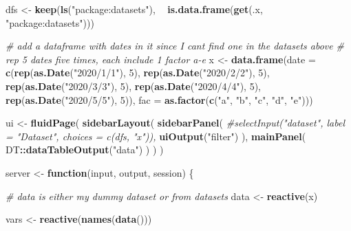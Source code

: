 \documentclass[]{book}
\newenvironment{Shaded}{\begin{snugshade}}{\end{snugshade}}
\newcommand{\CommentTok}[1]{\textcolor[rgb]{0.56,0.35,0.01}{\textit{#1}}}
\newcommand{\ControlFlowTok}[1]{\textcolor[rgb]{0.13,0.29,0.53}{\textbf{#1}}}
\newcommand{\DataTypeTok}[1]{\textcolor[rgb]{0.13,0.29,0.53}{#1}}
\newcommand{\DecValTok}[1]{\textcolor[rgb]{0.00,0.00,0.81}{#1}}
\newcommand{\KeywordTok}[1]{\textcolor[rgb]{0.13,0.29,0.53}{\textbf{#1}}}
\newcommand{\NormalTok}[1]{#1}
\newcommand{\OperatorTok}[1]{\textcolor[rgb]{0.81,0.36,0.00}{\textbf{#1}}}
\newcommand{\StringTok}[1]{\textcolor[rgb]{0.31,0.60,0.02}{#1}}
\begin{document}
\begin{solution}
\begin{Shaded}
\begin{Highlighting}[]
{{\NormalTok{dfs <-}\StringTok{ }\KeywordTok{keep}\NormalTok{(}\KeywordTok{ls}\NormalTok{(}\StringTok{"package:datasets"}\NormalTok{), }\OperatorTok{~}\StringTok{ }\KeywordTok{is.data.frame}\NormalTok{(}\KeywordTok{get}\NormalTok{(.x, }\StringTok{"package:datasets"}\NormalTok{)))}

\CommentTok{# add a dataframe with dates in it since I cant find one in the datasets above}
\CommentTok{# rep 5 dates five times, each include 1 factor a-e}
\NormalTok{x <-}\StringTok{ }\KeywordTok{data.frame}\NormalTok{(}\DataTypeTok{date =} \KeywordTok{c}\NormalTok{(}\KeywordTok{rep}\NormalTok{(}\KeywordTok{as.Date}\NormalTok{(}\StringTok{"2020/1/1"}\NormalTok{), }\DecValTok{5}\NormalTok{),}
                         \KeywordTok{rep}\NormalTok{(}\KeywordTok{as.Date}\NormalTok{(}\StringTok{"2020/2/2"}\NormalTok{), }\DecValTok{5}\NormalTok{),}
                         \KeywordTok{rep}\NormalTok{(}\KeywordTok{as.Date}\NormalTok{(}\StringTok{"2020/3/3"}\NormalTok{), }\DecValTok{5}\NormalTok{),}
                         \KeywordTok{rep}\NormalTok{(}\KeywordTok{as.Date}\NormalTok{(}\StringTok{"2020/4/4"}\NormalTok{), }\DecValTok{5}\NormalTok{),}
                         \KeywordTok{rep}\NormalTok{(}\KeywordTok{as.Date}\NormalTok{(}\StringTok{"2020/5/5"}\NormalTok{), }\DecValTok{5}\NormalTok{)),}
                \DataTypeTok{fac =} \KeywordTok{as.factor}\NormalTok{(}\KeywordTok{c}\NormalTok{(}\StringTok{"a"}\NormalTok{, }\StringTok{"b"}\NormalTok{, }\StringTok{"c"}\NormalTok{, }\StringTok{"d"}\NormalTok{, }\StringTok{"e"}\NormalTok{)))}

\NormalTok{ui <-}\StringTok{ }\KeywordTok{fluidPage}\NormalTok{(}
  \KeywordTok{sidebarLayout}\NormalTok{(}
    \KeywordTok{sidebarPanel}\NormalTok{(}
      \CommentTok{#selectInput("dataset", label = "Dataset", choices = c(dfs, "x")),}
      \KeywordTok{uiOutput}\NormalTok{(}\StringTok{"filter"}\NormalTok{)}
\NormalTok{    ),}
    \KeywordTok{mainPanel}\NormalTok{(}
\NormalTok{      DT}\OperatorTok{::}\KeywordTok{dataTableOutput}\NormalTok{(}\StringTok{"data"}\NormalTok{)}
\NormalTok{    )}
\NormalTok{  )}
\NormalTok{)}

\NormalTok{server <-}\StringTok{ }\ControlFlowTok{function}\NormalTok{(input, output, session) \{}
  
  \CommentTok{# data is either my dummy dataset or from datasets}
\NormalTok{  data <-}\StringTok{ }\KeywordTok{reactive}\NormalTok{(x)}
  
\NormalTok{  vars <-}\StringTok{ }\KeywordTok{reactive}\NormalTok{(}\KeywordTok{names}\NormalTok{(}\KeywordTok{data}\NormalTok{()))}
  
}}
\end{Highlighting}
\end{Shaded}
\end{solution}
\end{document}
